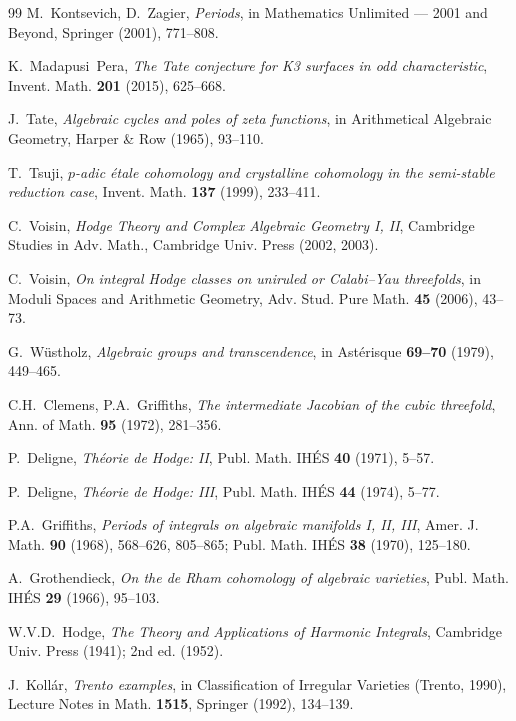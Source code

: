 \documentclass[11pt]{article}
\theoremstyle{definition}
\begin{document}
\begin{thebibliography}{99}
M.~Kontsevich, D.~Zagier,
\textit{Periods},
in Mathematics Unlimited --- 2001 and Beyond,
Springer (2001), 771--808.

K.~Madapusi~Pera,
\textit{The Tate conjecture for K3 surfaces in odd characteristic},
Invent. Math. \textbf{201} (2015), 625--668.

J.~Tate,
\textit{Algebraic cycles and poles of zeta functions},
in Arithmetical Algebraic Geometry, Harper \& Row (1965), 93--110.

T.~Tsuji,
\textit{$p$-adic \'etale cohomology and crystalline cohomology
in the semi-stable reduction case},
Invent. Math. \textbf{137} (1999), 233--411.

C.~Voisin,
\textit{Hodge Theory and Complex Algebraic Geometry I, II},
Cambridge Studies in Adv. Math., Cambridge Univ. Press (2002, 2003).

C.~Voisin,
\textit{On integral Hodge classes on uniruled or Calabi--Yau threefolds},
in Moduli Spaces and Arithmetic Geometry,
Adv. Stud. Pure Math. \textbf{45} (2006), 43--73.

G.~W\"ustholz,
\textit{Algebraic groups and transcendence},
in Ast\'erisque \textbf{69--70} (1979), 449--465.

C.H.~Clemens, P.A.~Griffiths,
\textit{The intermediate Jacobian of the cubic threefold},
Ann. of Math. \textbf{95} (1972), 281--356.

P.~Deligne,
\textit{Th\'eorie de Hodge: II},
Publ. Math. IH\'ES \textbf{40} (1971), 5--57.

P.~Deligne,
\textit{Th\'eorie de Hodge: III},
Publ. Math. IH\'ES \textbf{44} (1974), 5--77.

P.A.~Griffiths,
\textit{Periods of integrals on algebraic manifolds I, II, III},
Amer. J. Math. \textbf{90} (1968), 568--626, 805--865;
Publ. Math. IH\'ES \textbf{38} (1970), 125--180.

A.~Grothendieck,
\textit{On the de Rham cohomology of algebraic varieties},
Publ. Math. IH\'ES \textbf{29} (1966), 95--103.

W.V.D.~Hodge,
\textit{The Theory and Applications of Harmonic Integrals},
Cambridge Univ. Press (1941); 2nd ed. (1952).

J.~Koll\'ar,
\textit{Trento examples},
in Classification of Irregular Varieties (Trento, 1990),
Lecture Notes in Math. \textbf{1515}, Springer (1992), 134--139.


\end{thebibliography}
\end{document}
